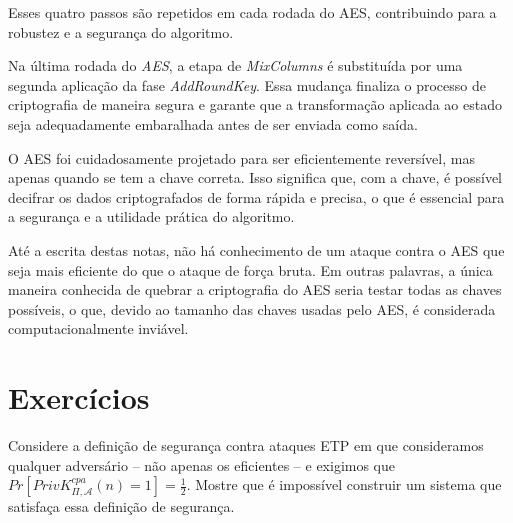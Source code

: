 Esses quatro passos são repetidos em cada rodada do AES, contribuindo para a robustez e a segurança do algoritmo.

Na última rodada do \textit{AES}, a etapa de \textit{MixColumns} é substituída por uma segunda aplicação da fase \textit{AddRoundKey}.
Essa mudança finaliza o processo de criptografia de maneira segura e garante que a transformação aplicada ao estado seja adequadamente embaralhada antes de ser enviada como saída.

O AES foi cuidadosamente projetado para ser eficientemente reversível, mas apenas quando se tem a chave correta.
Isso significa que, com a chave, é possível decifrar os dados criptografados de forma rápida e precisa, o que é essencial para a segurança e a utilidade prática do algoritmo.

Até a escrita destas notas, não há conhecimento de um ataque contra o AES que seja mais eficiente do que o ataque de força bruta.
Em outras palavras, a única maneira conhecida de quebrar a criptografia do AES seria testar todas as chaves possíveis, o que, devido ao tamanho das chaves usadas pelo AES, é considerada computacionalmente inviável.





\section{Exercícios}
\label{sec:exercicios}

\begin{exercicio}
  Considere a definição de segurança contra ataques ETP em que consideramos qualquer adversário -- não apenas os eficientes -- e exigimos que $Pr[PrivK^{cpa}_{\Pi,\mathcal{A}}(n) = 1] = \frac{1}{2}$.
  Mostre que é impossível construir um sistema que satisfaça essa definição de segurança.
\end{exercicio}

